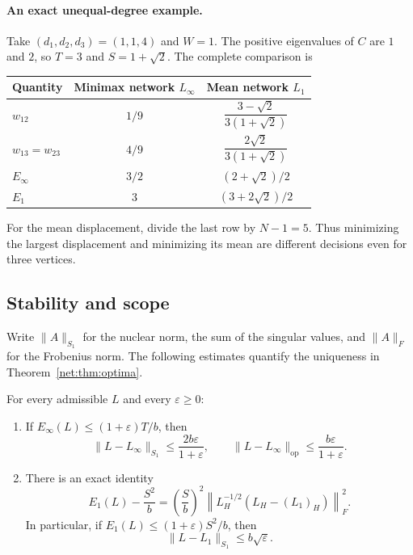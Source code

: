 \paragraph{An exact unequal-degree example.}
Take $(d_1,d_2,d_3)=(1,1,4)$ and $W=1$. The positive eigenvalues of $C$
are $1$ and $2$, so $T=3$ and $S=1+\sqrt2$. The complete comparison is
\begin{center}
\begin{tabular}{@{}lcc@{}}
\toprule
Quantity&Minimax network $L_{\infty}$&Mean network $L_1$\\
\midrule
$w_{12}$&$1/9$&$\dfrac{3-\sqrt2}{3(1+\sqrt2)}$\\[8pt]
$w_{13}=w_{23}$&$4/9$&$\dfrac{2\sqrt2}{3(1+\sqrt2)}$\\[8pt]
$E_{\infty}$&$3/2$&$(2+\sqrt2)/2$\\[4pt]
$E_1$&$3$&$(3+2\sqrt2)/2$\\
\bottomrule
\end{tabular}
\end{center}
For the mean displacement, divide the last row by $N-1=5$.
Thus minimizing the largest displacement and minimizing its mean are
different decisions even for three vertices.

\subsection{Stability and scope}

Write $\|A\|_{S_1}$ for the nuclear norm, the sum of the singular values,
and $\|A\|_F$ for the Frobenius norm. The following estimates quantify
the uniqueness in Theorem~\ref{net:thm:optima}.

\begin{theorem}\label{net:thm:stability}
For every admissible $L$ and every $\varepsilon\ge0$:
\begin{enumerate}
\item If $E_{\infty}(L)\le(1+\varepsilon)T/b$, then
\begin{equation}\label{net:eq:stability-infty}
 \|L-L_{\infty}\|_{S_1}\le\frac{2b\varepsilon}{1+\varepsilon},\qquad
 \|L-L_{\infty}\|_{\mathrm{op}}\le\frac{b\varepsilon}{1+\varepsilon}.
\end{equation}
\item There is an exact identity
\begin{equation}\label{net:eq:residual}
 E_1(L)-\frac{S^2}{b}
 =\left(\frac{S}{b}\right)^2
 \left\|L_H^{-1/2}(L_H-(L_1)_H)\right\|_F^2.
\end{equation}
In particular, if $E_1(L)\le(1+\varepsilon)S^2/b$, then
\begin{equation}\label{net:eq:stability-one}
 \|L-L_1\|_{S_1}\le b\sqrt\varepsilon.
\end{equation}
\end{enumerate}
\end{theorem}

